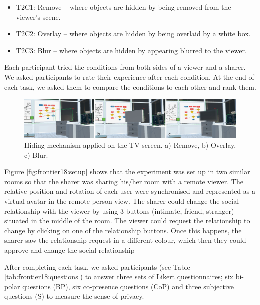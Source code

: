 \begin{itemize}
\item T2C1: Remove – where objects are hidden by being removed from the viewer’s scene.
\item T2C2: Overlay – where objects are hidden by being overlaid by a white box. 
\item T2C3: Blur – where objects are hidden by appearing blurred to the viewer. 
\end{itemize}

Each participant tried the conditions from both sides of a viewer and a sharer. We asked participants to rate their experience after each condition. At the end of each task, we asked them to compare the conditions to each other and rank them. 

\begin{figure}
\begin{center}
\includegraphics[width=\linewidth]{images/frontier18/images-01.png}
\caption{Hiding mechanism applied on the TV screen. a) Remove, b) Overlay, c) Blur.}\label{fig:frontier18:hiding-mechanism}
\end{center}
\end{figure}



Figure \ref{fig:frontier18:setup} shows that the experiment was set up in two similar rooms so that the sharer was sharing his/her room with a remote viewer. The relative position and rotation of each user were synchronised and represented as a virtual avatar in the remote person view. The sharer could change the social relationship with the viewer by using 3-buttons (intimate, friend, stranger) situated in the middle of the room. The viewer could request the relationship to change by clicking on one of the relationship buttons. Once this happens, the sharer saw the relationship request in a different colour, which then they could approve and change the social relationship

After completing each task, we asked participants (see Table \ref{tab:frontier18:questions}) to answer three sets of Likert questionnaires; six bi-polar questions (BP), six co-presence questions (CoP) and three subjective questions (S) to measure the sense of privacy.  

